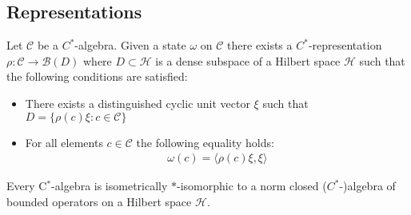 
\subsection{Representations}
	
	
	\begin{construct}
		Let $\mathcal{C}$ be a $C^*$-algebra. Given a state $\omega$ on $\mathcal{C}$ there exists a $C^*$-representation $\rho:\mathcal{C}\rightarrow\mathcal{B}(D)$ where $D\subset\mathcal{H}$ is a dense subspace of a Hilbert space $\mathcal{H}$ such that the following conditions are satisfied:
		\begin{itemize}
			\item There exists a distinguished cyclic unit vector $\xi$ such that $D = \{\rho(c)\xi: c\in\mathcal{C}\}$
			\item For all elements $c\in\mathcal{C}$ the following equality holds:
			\begin{gather}
				\omega(c) = \langle \rho(c)\xi,\xi \rangle
			\end{gather}
		\end{itemize}
	\end{construct}
	
	\begin{theorem}
		Every C$^*$-algebra is isometrically $\ast$-isomorphic to a norm closed ($C^*$-)algebra of bounded operators on a Hilbert space $\mathcal{H}$.
	\end{theorem}

